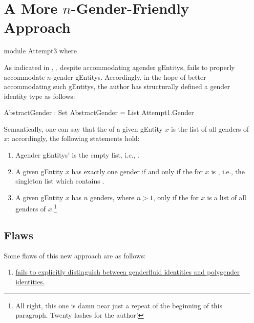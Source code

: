 \documentclass{article}
\begin{document}
\section{A More \(n\)-Gender-Friendly Approach}

\begin{code}
module Attempt3 where
\end{code}

As indicated in , , despite accommodating agender \glspl{gEntity}, fails to properly accommodate \(n\)-gender \glspl{gEntity}.  Accordingly, in the hope of better accommodating such \glspl{gEntity}, the author has structurally defined a gender identity type  as follows:

\begin{code}
  AbstractGender : Set
  AbstractGender = List Attempt1.Gender
\end{code}

Semantically, one can say that the  of a given \gls{gEntity} \(x\) is the list of all genders of \(x\); accordingly, the following statements hold:

\begin{enumerate}
  \item Agender \glspl{gEntity}'  is the empty list, i.e., \AgdaInductiveConstructor{[]}.
  \item A given \gls{gEntity} \(x\) has exactly one gender  if and only if the  for \(x\) is \AgdaOperator{\AgdaFunction{[}}  \AgdaOperator{\AgdaFunction{]}}, i.e., the singleton list which contains .
  \item A given \gls{gEntity} \(x\) has \(n\) genders, where \(n > 1\), only if the  for \(x\) is a list of all genders of \(x\).\footnote{All right, this one is damn near just a repeat of the beginning of this paragraph.  Twenty lashes for the author!}
\end{enumerate}

\subsection{Flaws}
Some flaws of this new approach are as follows:

\begin{enumerate}
  \item \hyperref[sec:gender3DistinctionFailure]{ fails to explicitly distinguish between genderfluid identities and polygender identities.}
\end{enumerate}
\end{document}

